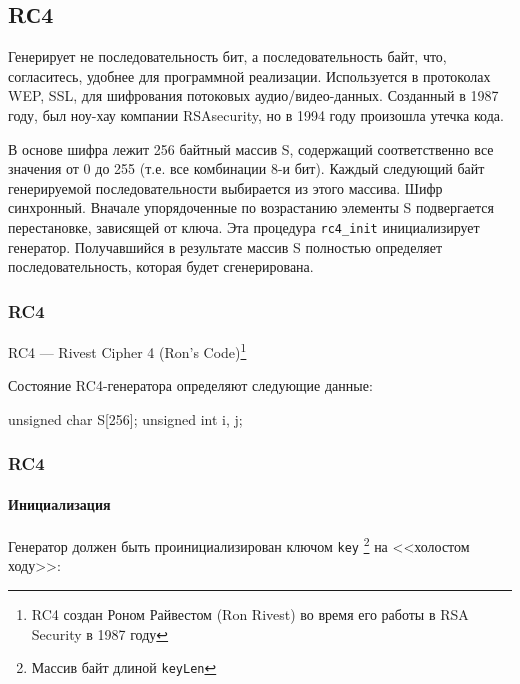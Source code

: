 \subsection{RС4}


Генерирует не последовательность бит, а последовательность байт, что, согласитесь, удобнее для программной реализации. Используется в протоколах WEP, SSL, для шифрования потоковых аудио/видео-данных. Созданный в 1987 году, был ноу-хау компании RSAsecurity, но в 1994 году произошла утечка кода.

В основе шифра лежит 256 байтный массив S, содержащий соответственно все значения от 0 до 255 (т.е. все комбинации 8-и бит). Каждый следующий байт генерируемой последовательности выбирается из этого массива. Шифр синхронный. Вначале упорядоченные по возрастанию элементы S подвергается перестановке, зависящей от ключа. Эта процедура \verb"rc4_init" инициализирует генератор. Получавшийся в результате массив S полностью определяет последовательность, которая будет сгенерирована.

\begin{frame}[fragile]
    \frametitle{RC4}

    \begin{definition}
        RC4 --- Rivest Cipher 4 (Ron’s Code)\footnote{RC4 создан Роном Райвестом (Ron Rivest) во время его работы в  RSA Security в 1987 году}
    \end{definition}

Состояние RC4-генератора определяют следующие данные:
\begin{semiverbatim}
    unsigned char S[256]; 
    unsigned int i, j;
\end{semiverbatim}
\end{frame}


\begin{frame}[fragile]
    \frametitle{RC4}
    \framesubtitle{Инициализация}

Генератор должен быть проинициализирован ключом \verb"key" \footnote{Массив байт длиной \verb"keyLen"} на <<холостом ходу>>:
\begin{semiverbatim}
\end{semiverbatim}
\end{frame}


